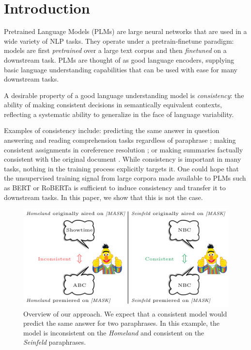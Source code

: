 \section{Introduction}
\label{sec:intro}

Pretrained Language Models (PLMs) are
large neural networks that are
used in a wide variety of NLP tasks. They operate under a
pretrain-finetune paradigm: models are first \emph{pretrained} over a large text corpus and then \emph{finetuned} on a downstream task. PLMs are thought of as good language encoders, supplying basic language understanding capabilities that can be used with ease for many downstream tasks.

A desirable property of a good language understanding model
is \emph{consistency}: the ability of  making consistent
decisions in semantically equivalent contexts, reflecting a
systematic ability to generalize in the face of language variability.


Examples of consistency include: predicting the same answer in question answering and reading comprehension tasks regardless of paraphrase \cite{consistent-qa}; making consistent assignments in coreference resolution \cite{denis2009global,chang2011inference}; or making summaries factually consistent with  the original document \cite{kryscinski2020evaluating}.
While consistency is important in many tasks, nothing in the
training process explicitly targets it. One could hope that
the unsupervised training signal from large corpora
made available to PLMs such as BERT or RoBERTa
\cite{bert,roberta} is sufficient to induce consistency and
transfer it to downstream tasks.
In this paper, we show that this is not the case.



\begin{figure}[t!]
\centering

\includegraphics[width=1.\columnwidth]{figures/overview2}

\caption{Overview of our approach. 
We expect that a consistent model would predict the same answer for %
 two paraphrases.
In this example, the model is inconsistent on the
\textit{Homeland} and consistent on the \textit{Seinfeld} paraphrases.}
\label{fig:overview}
\end{figure}


